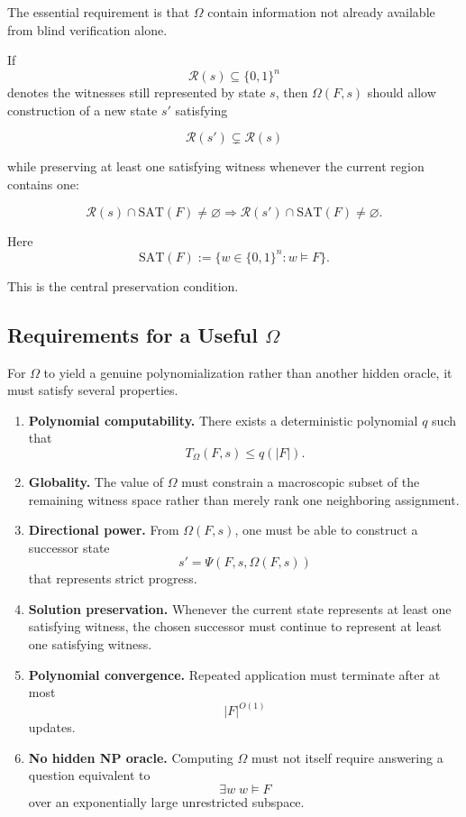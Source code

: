 \documentclass[11pt]{article}
\theoremstyle{plain}
\theoremstyle{definition}
\begin{document}
The essential requirement is that \(\Omega\) contain information not already
available from blind verification alone.

If
\[
    \mathcal{R}(s)\subseteq\{0,1\}^{n}
\]
denotes the witnesses still represented by state \(s\), then
\(\Omega(F,s)\) should allow construction of a new state \(s'\) satisfying

\[
    \mathcal{R}(s')
    \subsetneq
    \mathcal{R}(s)
\]

while preserving at least one satisfying witness whenever the current region
contains one:

\[
    \mathcal{R}(s)\cap\mathrm{SAT}(F)\neq\varnothing
    \Longrightarrow
    \mathcal{R}(s')\cap\mathrm{SAT}(F)\neq\varnothing.
\]

Here
\[
    \mathrm{SAT}(F)
    :=
    \{w\in\{0,1\}^{n}:w\models F\}.
\]

This is the central preservation condition.

\subsection{Requirements for a Useful \(\Omega\)}

For \(\Omega\) to yield a genuine polynomialization rather than another hidden
oracle, it must satisfy several properties.

\begin{enumerate}
    \item \textbf{Polynomial computability.}
    There exists a deterministic polynomial \(q\) such that
    \[
        T_{\Omega}(F,s)\leq q(|F|).
    \]

    \item \textbf{Globality.}
    The value of \(\Omega\) must constrain a macroscopic subset of the
    remaining witness space rather than merely rank one neighboring
    assignment.

    \item \textbf{Directional power.}
    From \(\Omega(F,s)\), one must be able to construct a successor state
    \[
        s'=\Psi(F,s,\Omega(F,s))
    \]
    that represents strict progress.

    \item \textbf{Solution preservation.}
    Whenever the current state represents at least one satisfying witness,
    the chosen successor must continue to represent at least one satisfying
    witness.

    \item \textbf{Polynomial convergence.}
    Repeated application must terminate after at most
    \[
        |F|^{O(1)}
    \]
    updates.

    \item \textbf{No hidden NP oracle.}
    Computing \(\Omega\) must not itself require answering a question
    equivalent to
    \[
        \exists w\; w\models F
    \]
    over an exponentially large unrestricted subspace.
\end{enumerate}
\end{document}
